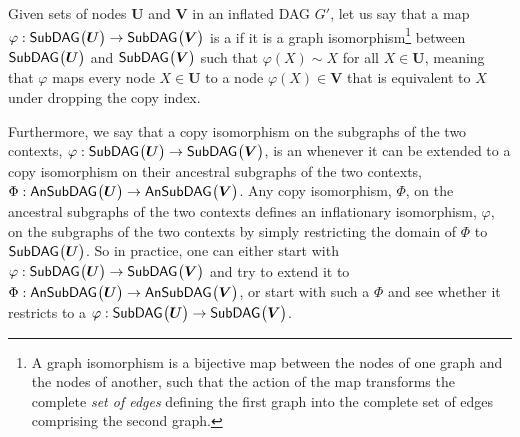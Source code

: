 {Given sets of nodes $\bm{U}$ and $\bm{V}$ in an inflated DAG $G'$, let us say that a map $\varphi:{\operatorname{\mathsf{SubDAG}}_{}}\bigl\lparen\bm{U}\bigr\rparen\to{\operatorname{\mathsf{SubDAG}}_{}}\bigl\lparen\bm{V}\bigr\rparen$ is a  if it is a graph isomorphism\footnote{A graph isomorphism is a bijective map between the nodes of one graph and the nodes of another, such that the action of the map transforms the complete \emph{set of edges} defining the first graph into the complete set of edges comprising the second graph.} between ${\operatorname{\mathsf{SubDAG}}_{}}\bigl\lparen\bm{U}\bigr\rparen$ and ${\operatorname{\mathsf{SubDAG}}_{}}\bigl\lparen\bm{V}\bigr\rparen$ such that $\varphi(X)\sim X$ for all $X\in\bm{U}$, meaning that $\varphi$ maps every node $X\in\bm{U}$ to a node $\varphi(X)\in\bm{V}$ that is equivalent to $X$ under dropping the copy index. %


Furthermore, we say that a copy isomorphism on the subgraphs of the two contexts, $\varphi : {\operatorname{\mathsf{SubDAG}}_{}}\bigl\lparen\bm{U}\bigr\rparen\to{\operatorname{\mathsf{SubDAG}}_{}}\bigl\lparen\bm{V}\bigr\rparen$, is an  whenever it can be extended to a copy isomorphism on their ancestral subgraphs of the two contexts, $\Phi : {\operatorname{\mathsf{AnSubDAG}}_{}}\bigl\lparen\bm{U}\bigr\rparen\to{\operatorname{\mathsf{AnSubDAG}}_{}}\bigl\lparen\bm{V}\bigr\rparen$. %
Any copy isomorphism, $\Phi$, on the ancestral subgraphs of the two contexts defines an inflationary isomorphism, $\varphi$, on the subgraphs of the two contexts by simply restricting the domain of $\Phi$ to ${\operatorname{\mathsf{SubDAG}}_{}}\bigl\lparen\bm{U}\bigr\rparen$.
So in practice, one can either start with $\varphi : {\operatorname{\mathsf{SubDAG}}_{}}\bigl\lparen\bm{U}\bigr\rparen\to{\operatorname{\mathsf{SubDAG}}_{}}\bigl\lparen\bm{V}\bigr\rparen$ and try to extend it to $\Phi : {\operatorname{\mathsf{AnSubDAG}}_{}}\bigl\lparen\bm{U}\bigr\rparen\to{\operatorname{\mathsf{AnSubDAG}}_{}}\bigl\lparen\bm{V}\bigr\rparen$, or start with such a $\Phi$ and see whether it restricts to a $\varphi:{\operatorname{\mathsf{SubDAG}}_{}}\bigl\lparen\bm{U}\bigr\rparen\to{\operatorname{\mathsf{SubDAG}}_{}}\bigl\lparen\bm{V}\bigr\rparen$.

}
